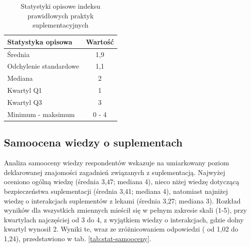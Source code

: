 


\begin{table}[H]
    \centering
    \caption{Statystyki opisowe indeksu prawidłowych praktyk suplementacyjnych}
    \label{tab:stat-indeksu-praktyk}
    \begin{tabular}{|l|c|}
        \hline
        \textbf{Statystyka opisowa} & \textbf{Wartość} \\
        \hline
        \hline
        Średnia & 1,9 \\
        \hline
        Odchylenie standardowe & 1,1 \\
        \hline
        Mediana & 2 \\
        \hline
        Kwartyl Q1 & 1 \\
        \hline
        Kwartyl Q3 & 3 \\
        \hline
        Minimum - maksimum & 0 - 4 \\
        \hline
    \end{tabular}
\end{table}


\subsection{Samoocena wiedzy o suplementach}



Analiza samooceny wiedzy respondentów wskazuje na umiarkowany poziom deklarowanej znajomości zagadnień związanych z suplementacją. Najwyżej oceniono ogólną wiedzę (średnia 3,47; mediana 4), nieco niżej wiedzę dotyczącą bezpieczeństwa suplementacji (średnia 3,41; mediana 4), natomiast najniżej wiedzę o interakcjach suplementów z lekami (średnia 3,27; mediana 3). Rozkład wyników dla wszystkich zmiennych mieścił się w pełnym zakresie skali (1-5), przy kwartylach najczęściej od 3 do 4, z wyjątkiem wiedzy o interakcjach, gdzie dolny kwartyl wynosił 2. Wyniki te, wraz ze zróżnicowaniem odpowiedzi ( od 1,02 do 1,24), przedstawiono w tab. \ref{tab:stat-samooceny}.

